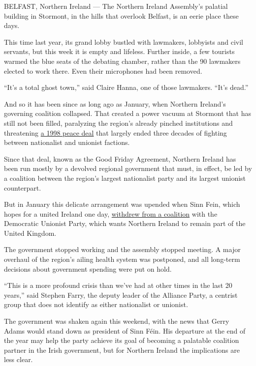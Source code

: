 BELFAST, Northern Ireland --- The Northern Ireland Assembly's palatial
building in Stormont, in the hills that overlook Belfast, is an eerie
place these days.

This time last year, its grand lobby bustled with lawmakers, lobbyists
and civil servants, but this week it is empty and lifeless. Further
inside, a few tourists warmed the blue seats of the debating chamber,
rather than the 90 lawmakers elected to work there. Even their
microphones had been removed.

``It's a total ghost town,'' said Claire Hanna, one of those lawmakers.
``It's dead.''

And so it has been since as long ago as January, when Northern Ireland's
governing coalition collapsed. That created a power vacuum at Stormont
that has still not been filled, paralyzing the region's already pinched
institutions and threatening
\href{http://www.nytimes.com/1998/10/17/world/2-ulster-peacemakers-win-the-nobel-prize.html}{a
1998 peace deal} that largely ended three decades of fighting between
nationalist and unionist factions.

Since that deal, known as the Good Friday Agreement, Northern Ireland
has been run mostly by a devolved regional government that must, in
effect, be led by a coalition between the region's largest nationalist
party and its largest unionist counterpart.

But in January this delicate arrangement was upended when Sinn Fein,
which hopes for a united Ireland one day,
\href{https://www.nytimes.com/2017/01/16/world/europe/northern-ireland-early-election.html}{withdrew
from a coalition} with the Democratic Unionist Party, which wants
Northern Ireland to remain part of the United Kingdom.

The government stopped working and the assembly stopped meeting. A major
overhaul of the region's ailing health system was postponed, and all
long-term decisions about government spending were put on hold.

``This is a more profound crisis than we've had at other times in the
last 20 years,'' said Stephen Farry, the deputy leader of the Alliance
Party, a centrist group that does not identify as either nationalist or
unionist.

The government was shaken again this weekend, with the news that Gerry
Adams would stand down as president of Sinn Féin. His departure at the
end of the year may help the party achieve its goal of becoming a
palatable coalition partner in the Irish government, but for Northern
Ireland the implications are less clear.

